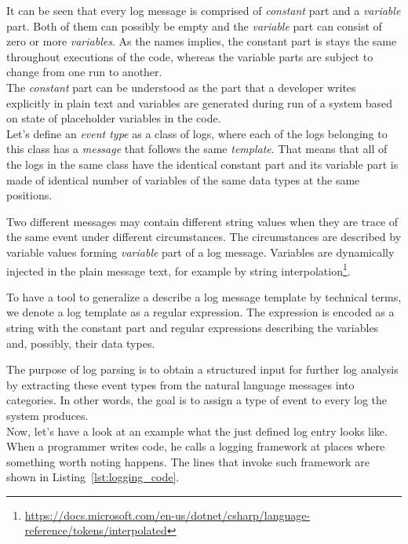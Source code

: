 It can be seen that every log message is comprised of \textit{constant} part and a \textit{variable} part. Both of them can possibly be empty and the \textit{variable} part can consist of zero or more \textit{variables}.
As the names implies, the constant part is stays the same throughout executions of the code, whereas the variable parts are subject to change from one run to another.\\
The \textit{constant} part can be understood as the part that a developer writes explicitly in plain text and variables are generated during run of a system based on state of placeholder variables in the code.\\

Let's define an \textit{event type} as a class of logs, where each of the logs belonging to this class has a \textit{message} that follows the same \textit{template}. That means that all of the logs in the same class have the identical constant part and its variable part is made of identical number of variables of the same data types at the same positions.

Two different messages may contain different string values when they are trace of the same event under different circumstances. The circumstances are described by variable values forming \textit{variable} part of a log message. Variables are dynamically injected in the plain message text, for example by string interpolation\footnote{\url{https://docs.microsoft.com/en-us/dotnet/csharp/language-reference/tokens/interpolated}}.

To have a tool to generalize a describe a log message template by technical terms, we denote a log template as a regular expression. The expression is encoded as a string with the constant part and regular expressions describing the variables and, possibly, their data types.

The purpose of log parsing is to obtain a structured input for further log analysis by extracting these event types from the natural language messages into categories.
In other words, the goal is to assign a type of event to every log the system produces.\\

Now, let's have a look at an example what the just defined log entry looks like.
When a programmer writes code, he calls a logging framework at places where something worth noting happens. The lines that invoke such framework are shown in Listing~\ref{lst:logging_code}.\\

